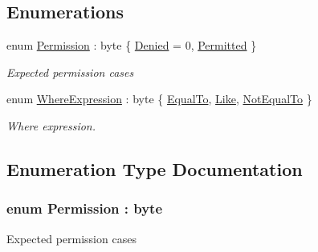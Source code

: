 \subsection*{Enumerations}
\begin{DoxyCompactItemize}
\item 
enum \hyperlink{namespaceOTA_1_1Data_a5335d23d62bc219ccbf40b018c002e8d}{Permission} \+: byte \{ \hyperlink{namespaceOTA_1_1Data_a5335d23d62bc219ccbf40b018c002e8da58d036b9b7f0e7eb38cfb90f1cc70a73}{Denied} = 0, 
\hyperlink{namespaceOTA_1_1Data_a5335d23d62bc219ccbf40b018c002e8dad383a04a7397ca336d985e7e55d78ad5}{Permitted}
 \}\begin{DoxyCompactList}\small\item\em Expected permission cases \end{DoxyCompactList}
\item 
enum \hyperlink{namespaceOTA_1_1Data_a0a3d8ce6f0cb05b3e9b4641ea9464d9e}{Where\+Expression} \+: byte \{ \hyperlink{namespaceOTA_1_1Data_a0a3d8ce6f0cb05b3e9b4641ea9464d9ea0242c502bd906e05171e64bad31c7c21}{Equal\+To}, 
\hyperlink{namespaceOTA_1_1Data_a0a3d8ce6f0cb05b3e9b4641ea9464d9ea98b82c200a2e309b24cb481970f3fcc4}{Like}, 
\hyperlink{namespaceOTA_1_1Data_a0a3d8ce6f0cb05b3e9b4641ea9464d9ea0961129d84d9d8f6aa4138a3e5022a1d}{Not\+Equal\+To}
 \}\begin{DoxyCompactList}\small\item\em Where expression. \end{DoxyCompactList}
\end{DoxyCompactItemize}


\subsection{Enumeration Type Documentation}
\hypertarget{namespaceOTA_1_1Data_a5335d23d62bc219ccbf40b018c002e8d}{}
\subsubsection[{Permission}]{\setlength{\rightskip}{0pt plus 5cm}enum {\bf Permission} \+: byte\hspace{0.3cm}{\ttfamily [strong]}}\label{namespaceOTA_1_1Data_a5335d23d62bc219ccbf40b018c002e8d}


Expected permission cases 

